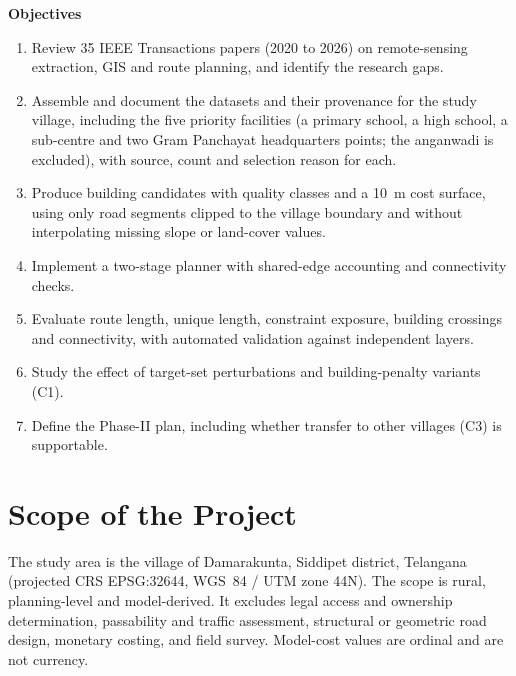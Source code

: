 \documentclass[12pt,a4paper]{report}
\begin{document}
\textbf{Objectives}
\begin{enumerate}[nosep,label=O\arabic*.]
\item Review 35 IEEE Transactions papers (2020 to 2026) on remote-sensing extraction, GIS and route planning, and identify the research gaps.
\item Assemble and document the datasets and their provenance for the study village, including the five priority facilities (a primary school, a high school, a sub-centre and two Gram Panchayat headquarters points; the anganwadi is excluded), with source, count and selection reason for each.
\item Produce building candidates with quality classes and a 10~m cost surface, using only road segments clipped to the village boundary and without interpolating missing slope or land-cover values.
\item Implement a two-stage planner with shared-edge accounting and connectivity checks.
\item Evaluate route length, unique length, constraint exposure, building crossings and connectivity, with automated validation against independent layers.
\item Study the effect of target-set perturbations and building-penalty variants (C1).
\item Define the Phase-II plan, including whether transfer to other villages (C3) is supportable.
\end{enumerate}

\section{Scope of the Project}
The study area is the village of Damarakunta, Siddipet district, Telangana (projected CRS EPSG:32644, WGS~84 / UTM zone 44N). The scope is rural, planning-level and model-derived. It excludes legal access and ownership determination, passability and traffic assessment, structural or geometric road design, monetary costing, and field survey. Model-cost values are ordinal and are not currency.
\end{document}
